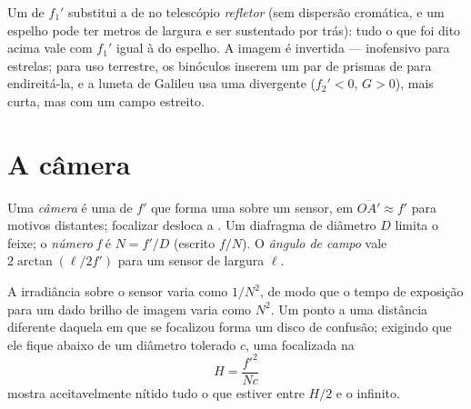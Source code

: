 \begin{remark}\label{rem:b1:optical-instruments:variants}
Um  de  $f_1'$ substitui a  de  no
telescópio \emph{refletor} (sem dispersão cromática, e um espelho
pode ter metros de largura e ser sustentado por trás): tudo o que foi dito acima
vale com $f_1'$ igual à  do espelho. A imagem é invertida ---
inofensivo para estrelas; para uso terrestre, os binóculos inserem um par de
prismas de  para endireitá-la, e a luneta de Galileu usa uma
 divergente ($f_2' < 0$, $G > 0$), mais curta, mas com um campo
estreito.
\end{remark}

\section{A câmera}

\begin{definition}\label{def:b1:optical-instruments:camera}
Uma \emph{câmera} é uma  de  $f'$ que forma uma  sobre um sensor, em $\overline{OA'} \approx f'$ para motivos distantes;
focalizar desloca a . Um diafragma de diâmetro $D$ limita o feixe;
o \emph{número f} é $N = f'/D$ (escrito $f/N$). O \emph{ângulo de
campo} vale $2\arctan(\ell/2f')$ para um sensor de largura $\ell$.
\end{definition}

\begin{proposition}\label{prop:b1:optical-instruments:dof}
A irradiância sobre o sensor varia como $1/N^2$, de modo que o tempo de exposição
para um dado brilho de imagem varia como $N^2$. Um ponto a uma distância
diferente daquela em que se focalizou forma um disco de confusão; exigindo que ele fique
abaixo de um diâmetro tolerado $c$, uma  focalizada na \emph{}
\[
H = \frac{f'^2}{N c}
\]
mostra aceitavelmente nítido tudo o que estiver entre $H/2$ e o infinito.
\end{proposition}

